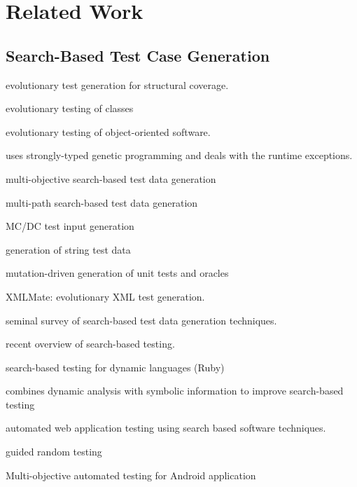 \documentclass[sigconf]{acmart}
\begin{document}
\section{Related Work}
\label{sec:related.work}

\subsection{Search-Based Test Case Generation}
\label{sub.sec.search.based}

\cite{wegener2001evolutionary} evolutionary test generation for structural coverage.

\cite{tonella2004evolutionary} evolutionary testing of classes

\cite{wappler2005using} evolutionary testing of object-oriented software.

\cite{wappler2006evolutionary} uses strongly-typed genetic programming and deals with the runtime exceptions.

\cite{lakhotia2007multi} multi-objective search-based test data generation 

\cite{cao2009search} multi-path search-based test data generation

\cite{awedikian2009mc} MC/DC test input generation 

\cite{shahbazi2016black} generation of string test data

\cite{fraser2012mutation} mutation-driven generation of unit tests and oracles

\cite{havrikov2014xmlmate} XMLMate: evolutionary XML test generation.

\cite{mcminn2004search} seminal survey of search-based test data generation techniques.

\cite{mcminn2011search} recent overview of search-based testing.

\cite{mairhofer2011search} search-based testing for dynamic languages (Ruby)

\cite{baars2011symbolic} combines dynamic analysis with symbolic information to improve search-based testing

\cite{alshahwan2011automated} automated web application testing using search based software techniques.

\cite{ma2015grt} guided random testing

\cite{mao2016sapienz} Multi-objective automated testing for Android application
\end{document}
